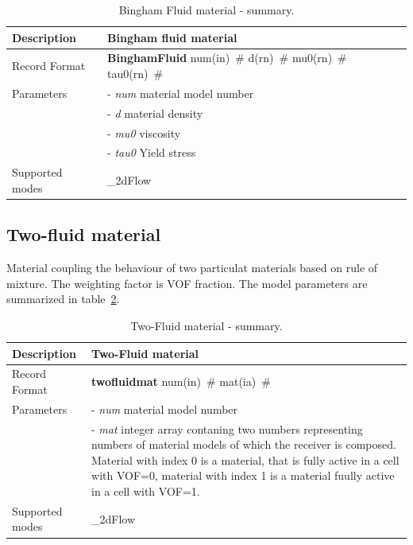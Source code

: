 \documentclass[a4paper]{article}
\newcommand{\descitem}[1]{{\noindent \bf #1}}
\newcommand{\elemparam}[2]{{{#1\tiny (#2)}~\#}}
\newcommand{\param}[1]{{\it #1}}
\begin{document}
\begin{table}[!htb]
\begin{tabular}{|l|p{9cm}|}
\hline
Description & Bingham fluid material\\
\hline
Record Format & \descitem{BinghamFluid} \elemparam{num}{in}
\elemparam{d}{rn} \elemparam{mu0}{rn} \elemparam{tau0}{rn}\\
Parameters &- \param{num} material model number\\
&- \param{d} material density\\
&- \param{mu0} viscosity\\
&- \param{tau0} Yield stress\\
Supported modes& \_2dFlow\\
\hline
\end{tabular}
\caption{Bingham Fluid material - summary.}
\label{BinghamFluidMaterial_table}
\end{table}



\subsection{Two-fluid material}
\label{TwoFluidMaterial}
Material coupling the behaviour of two particulat materials based on
rule of mixture. The weighting factor is VOF fraction.
The model parameters are summarized in table~\ref{TwoFluidMaterial_table}.

\begin{table}[!htb]
\begin{tabular}{|l|p{9cm}|}
\hline
Description & Two-Fluid material\\
\hline
Record Format & \descitem{twofluidmat} \elemparam{num}{in}
\elemparam{mat}{ia}\\
Parameters &- \param{num} material model number\\
&- \param{mat} integer array contaning two numbers representing
numbers of material models of which the receiver is composed. Material
with index 0 is a material, that is fully active in a cell with VOF=0,
material with index 1 is a material fuully active in a cell with VOF=1.\\
Supported modes& \_2dFlow\\
\hline
\end{tabular}
\caption{Two-Fluid material - summary.}
\label{TwoFluidMaterial_table}
\end{table}
\end{document}
